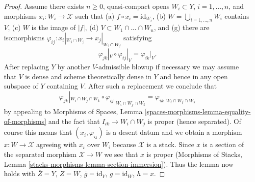 \documentclass[10pt,a4paper]{amsart}
\theoremstyle{plain}
\theoremstyle{definition}
\theoremstyle{remark}
\numberwithin{equation}{subsection}
\begin{document}
\begin{proof}
\medskip\noindent
Assume there exists $n \geq 0$, quasi-compact opens
$W_i \subset Y$, $i = 1, \ldots, n$, and
morphisms $x_i : W_i \to \mathcal{X}$ such that
(a) $f \circ x_i = \text{id}_{W_i}$,
(b) $W = \bigcup_{i = 1, \ldots, n} W_i$ contains $V$,
(c) $W$ is the image of $|f|$,
(d) $V \subset W_1 \cap \ldots \cap W_n$, and
(g) there are isomorphisms
$\varphi_{ij} : x_i|_{W_i \cap W_j} \to x_j|_{W_i \cap W_j}$
satisfying
$$
\varphi_{jk}|_V \circ \varphi_{ij}|_V = \varphi_{ik}|_V.
$$
After replacing $Y$ by another $V$-admissible blowup if necessary
we may assume that $V$ is dense and scheme theoretically dense
in $Y$ and hence in any open subspace of $Y$ containing $V$.
After such a replacement we conclude that
$$
\varphi_{jk}|_{W_i \cap W_j \cap W_k} \circ
\varphi_{ij}|_{W_i \cap W_j \cap W_k} =
\varphi_{ik}|_{W_i \cap W_j \cap W_k}
$$
by appealing to Morphisms of Spaces, Lemma
\ref{spaces-morphisms-lemma-equality-of-morphisms}
and the fact that $I_{ik} \to W_i \cap W_j$ is proper
(hence separated).
Of course this means that $(x_i, \varphi_{ij})$
is a desent datum and we obtain a morphism
$x : W \to \mathcal{X}$ agreeing with $x_i$ over $W_i$
because $\mathcal{X}$ is a stack.
Since $x$ is a section of the separated morphism
$\mathcal{X} \to W$ we see that $x$ is proper
(Morphisms of Stacks, Lemma \ref{stacks-morphisms-lemma-section-immersion}).
Thus the lemma now holds with $\overline{Z} = Y$,
$Z = W$, $\overline{g} = \text{id}_Y$, $g = \text{id}_W$,
$h = x$.
\end{proof}
\end{document}
